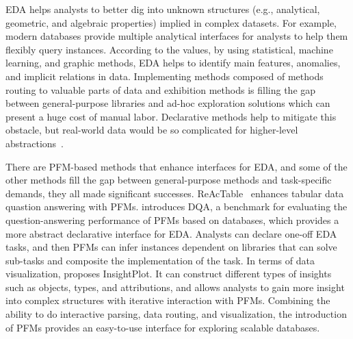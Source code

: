   EDA helps analysts to better dig into unknown structures (e.g., analytical, geometric, and algebraic properties) implied in complex datasets. For example, modern databases provide multiple analytical interfaces for analysts to help them flexibly query instances. According to the values, by using statistical, machine learning, and graphic methods, EDA helps to identify main features, anomalies, and implicit relations in data. Implementing methods composed of methods routing to valuable parts of data and exhibition methods is filling the gap between general-purpose libraries and ad-hoc exploration solutions which can present a huge cost of manual labor. Declarative methods help to mitigate this obstacle, but real-world data would be so complicated for higher-level abstractions~\cite{heer2010declarative, shih2018declarative, kim2022cicero}. 
  
  There are PFM-based methods that enhance interfaces for EDA, and some of the other methods fill the gap between general-purpose methods and task-specific demands, they all made significant successes. ReAcTable~\cite{ReActTable} enhances tabular data quastion answering with PFMs. \cite{zheng2024revolutionizing} introduces DQA, a benchmark for evaluating the question-answering performance of PFMs based on databases, which provides a more abstract declarative interface for EDA. Analysts can declare one-off EDA tasks, and then PFMs can infer instances dependent on libraries that can solve sub-tasks and composite the implementation of the task. In terms of data visualization, \cite{ma2023insightpilot} proposes InsightPlot. It can construct different types of insights such as objects, types, and attributions, and allows analysts to gain more insight into complex structures with iterative interaction with PFMs. Combining the ability to do interactive parsing, data routing, and visualization, the introduction of PFMs provides an easy-to-use interface for exploring scalable databases. 
  
